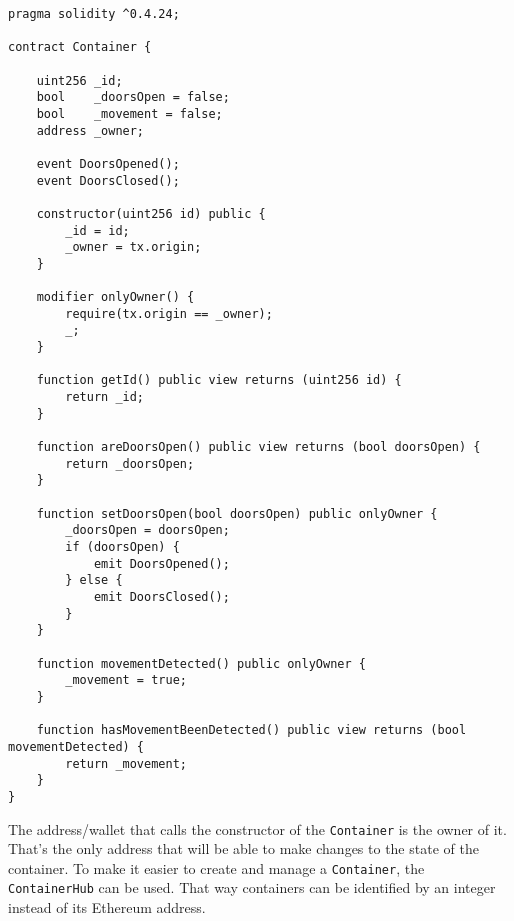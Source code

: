 \documentclass[12pt]{article}
\begin{document}
\begin{lstlisting}[frame=single,basicstyle=\tiny,language=Solidity]
pragma solidity ^0.4.24;

contract Container {

    uint256 _id;
    bool    _doorsOpen = false;
    bool    _movement = false;
    address _owner;

    event DoorsOpened();
    event DoorsClosed();

    constructor(uint256 id) public {
        _id = id;
        _owner = tx.origin;
    }

    modifier onlyOwner() {
        require(tx.origin == _owner);
        _;
    }

    function getId() public view returns (uint256 id) {
        return _id;
    }

    function areDoorsOpen() public view returns (bool doorsOpen) {
        return _doorsOpen;
    }

    function setDoorsOpen(bool doorsOpen) public onlyOwner {
        _doorsOpen = doorsOpen;
        if (doorsOpen) {
            emit DoorsOpened();
        } else {
            emit DoorsClosed();
        }
    }

    function movementDetected() public onlyOwner {
        _movement = true;
    }

    function hasMovementBeenDetected() public view returns (bool movementDetected) {
        return _movement;
    }
}
\end{lstlisting}
\vspace{.5cm}
The address/wallet that calls the constructor of the \texttt{Container} is the owner of it. That's the only address that will be able to make changes to the state of the container. To make it easier to create and manage a \texttt{Container}, the \texttt{ContainerHub} can be used. That way containers can be identified by an integer instead of its Ethereum address.
\vspace{.3cm}
\end{document}
